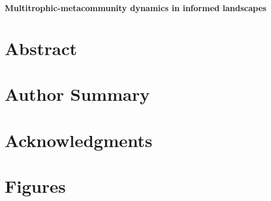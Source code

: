 \documentclass[10pt]{article}
\date{}
\begin{document}
\begin{flushleft}
{\Large
\textbf{Multitrophic-metacommunity dynamics in informed landscapes}
}
\end{flushleft}

\section*{Abstract}

\cite{desantana2013topological}
\section*{Author Summary}







\section*{Acknowledgments}




\vspace{1cm}
\section*{Figures}
\end{document}
